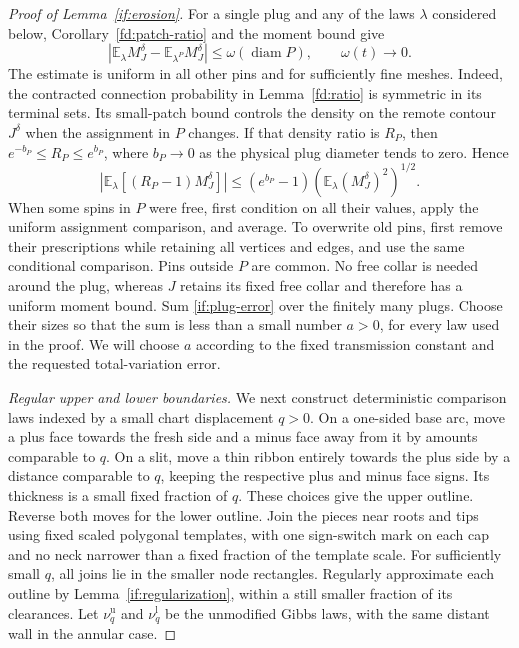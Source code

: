 \begin{proof}[Proof of Lemma~\ref{if:erosion}]
For a single plug and any of the laws $\lambda$ considered below,
Corollary~\ref{fd:patch-ratio} and the moment bound give
\begin{equation}\label{if:plug-error}
       |\mathbb E_{\lambda}M_J^\delta
               -\mathbb E_{\lambda^P}M_J^\delta|
           \le \omega(\operatorname{diam}P),\qquad \omega(t)\longrightarrow0.
\end{equation}
The estimate is uniform in all other pins and for sufficiently fine
meshes. Indeed, the contracted connection probability in
Lemma~\ref{fd:ratio} is symmetric in its terminal sets. Its small-patch
bound controls the density on the remote contour $J^\delta$ when
the assignment in $P$ changes. If that density ratio is $R_P$, then
$e^{-b_P}\le R_P\le e^{b_P}$, where $b_P\to0$ as the physical plug
diameter tends to zero. Hence
\[
 \left|\mathbb E_{\lambda}[(R_P-1)M_J^\delta]\right|
 \le (e^{b_P}-1)
             \left(\mathbb E_{\lambda}(M_J^\delta)^2\right)^{1/2}.
\]
When some spins in $P$ were free, first condition on all their values,
apply the uniform assignment comparison, and average. To overwrite
old pins, first remove their prescriptions while retaining all vertices
and edges, and use the same conditional comparison. Pins outside $P$
are common. No free collar is needed around the plug, whereas $J$
retains its fixed free collar and therefore has a uniform moment bound.
Sum \eqref{if:plug-error} over the finitely many plugs. Choose their
sizes so that the sum is less than a small number $a>0$, for every
law used in the proof. We will choose $a$ according to the fixed
transmission constant and the requested total-variation error.

\emph{Regular upper and lower boundaries.}
We next construct deterministic comparison laws indexed by a small
chart displacement $q>0$. On a one-sided base arc, move a plus face
towards the fresh side and a minus face away from it by amounts
comparable to $q$. On a slit, move a thin ribbon entirely towards
the plus side by a distance comparable to $q$, keeping the respective
plus and minus face signs. Its thickness is a small fixed fraction
of $q$. These choices give the upper outline. Reverse both moves
for the lower outline. Join the pieces near roots and tips using
fixed scaled polygonal templates, with one sign-switch mark on
each cap and no neck narrower than a fixed fraction of the template
scale. For sufficiently small $q$, all joins lie in the smaller node
rectangles. Regularly approximate each outline by
Lemma~\ref{if:regularization}, within a still smaller fraction of its
clearances. Let $\nu_q^{\mathrm u}$ and $\nu_q^{\mathrm l}$ be the
unmodified Gibbs laws, with the same distant wall in the annular case.


\end{proof}
